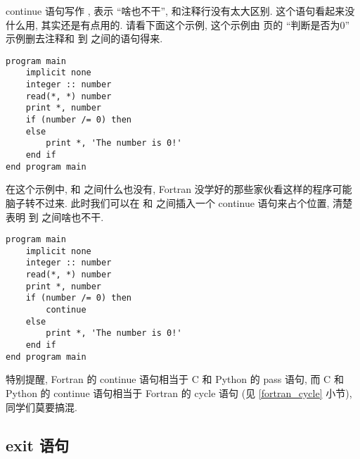continue 语句写作 , 表示 ``啥也不干'', 和注释行没有太大区别. 这个语句看起来没什么用, 其实还是有点用的. 请看下面这个示例, 这个示例由 \pageref{whether_zero} 页的 ``判断是否为0'' 示例删去注释和  到  之间的语句得来.
\begin{lstlisting}
program main
    implicit none
    integer :: number
    read(*, *) number
    print *, number
    if (number /= 0) then
    else
        print *, 'The number is 0!'
    end if
end program main
\end{lstlisting}
在这个示例中,  和  之间什么也没有, Fortran 没学好的那些家伙看这样的程序可能脑子转不过来. 此时我们可以在  和  之间插入一个 continue 语句来占个位置, 清楚表明  到  之间啥也不干.
\begin{lstlisting}
program main
    implicit none
    integer :: number
    read(*, *) number
    print *, number
    if (number /= 0) then
        continue
    else
        print *, 'The number is 0!'
    end if
end program main
\end{lstlisting}

特别提醒, Fortran 的 continue 语句相当于 C 和 Python 的 pass 语句, 而 C 和 Python 的 continue 语句相当于 Fortran 的 cycle 语句 (见 \ref{fortran_cycle} 小节), 同学们莫要搞混.

\subsection{exit 语句}\label{fortran_exit}

